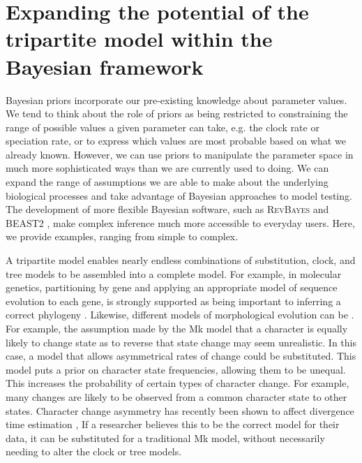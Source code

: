 \section{Expanding the potential of the tripartite model within the Bayesian framework}

Bayesian priors incorporate our pre-existing knowledge about parameter values. %
We tend to think about the role of priors as being restricted to  constraining the range of possible values a given parameter can take, e.g. the clock rate or speciation rate, or to express which values are most probable based on what we already known.
However, we can use priors to manipulate the parameter space in much more sophisticated ways than we are currently used to doing.
We can expand the range of assumptions we are able to make about the underlying biological processes and take advantage of Bayesian approaches to model testing.
The development of more flexible Bayesian software, such as \textsc{RevBayes} \citep{Hoehna2014b, Hoehna2016b} and BEAST2 \citep{BEAST2}, make complex inference much more accessible to everyday users.
Here, we provide examples, ranging from simple to complex.

A tripartite model enables nearly endless combinations of substitution, clock, and tree models to be assembled into a complete model.
For example, in molecular genetics, partitioning by gene and applying an appropriate model of sequence evolution to each gene, is strongly supported as being important to inferring a correct phylogeny \citep{Brandley2005}.
Likewise, different models of morphological evolution can be . %
For example, the assumption made by the Mk model that a character is equally likely to change state as to reverse that state change may seem unrealistic. 
In this case, a model that allows asymmetrical rates of change \citep{Ronquist2004} could be substituted. 
 This model puts a prior on character state frequencies, allowing them to be unequal.
 This increases the probability of certain types of character change.
 For example, many changes are likely to be observed from a common character state to other states.
Character change asymmetry has recently been shown to affect divergence time estimation \citep{Klopfstein2019}, 
If a researcher believes this to be the correct model for their data, it can be substituted for a traditional Mk model, without necessarily needing to alter the clock or tree models. 

